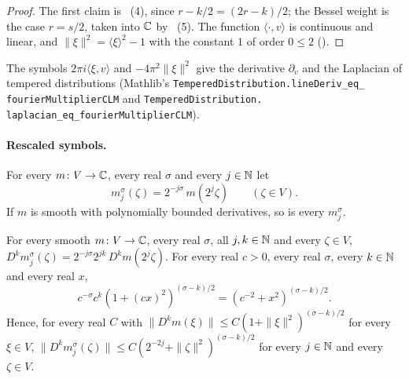 \begin{proof}
\leanok
The first claim is ~(4), since $r - k/2 = (2r - k)/2$; the
Bessel weight is the case $r = s/2$, taken into $\mathbb{C}$ by ~(5). The
function $\langle \cdot, v \rangle$ is continuous and linear, and
$\|\xi\|^2 = \langle \xi \rangle^2 - 1$ with the constant $1$ of order $0 \leq 2$
().
\end{proof}

The symbols $2\pi i \langle \xi, v \rangle$ and $-4\pi^2 \|\xi\|^2$ give the derivative
$\partial_v$ and the Laplacian of tempered distributions (Mathlib's
\texttt{TemperedDistribution.\allowbreak lineDeriv\_\allowbreak eq\_\allowbreak
fourier\allowbreak MultiplierCLM} and \texttt{TemperedDistribution.\allowbreak
laplacian\_\allowbreak eq\_\allowbreak fourier\allowbreak MultiplierCLM}).

\paragraph{Rescaled symbols.}

\begin{definition}
\label{def:scaled-symbol}
\leanok
For every $m \colon V \to \mathbb{C}$, every real $\sigma$ and every $j \in \mathbb{N}$ let
\[
  m^\sigma_j(\zeta) = 2^{-j\sigma} \, m(2^j \zeta) \qquad (\zeta \in V) .
\]
If $m$ is smooth with polynomially bounded derivatives, so is every $m^\sigma_j$.
\end{definition}

\begin{lemma}
\label{lem:scaled-symbol-derivatives}
\leanok
{}
For every smooth $m \colon V \to \mathbb{C}$, every real $\sigma$, all $j, k \in \mathbb{N}$ and every
$\zeta \in V$,
$D^k m^\sigma_j(\zeta) = 2^{-j\sigma} 2^{jk} \, D^k m(2^j \zeta)$. For every real $c > 0$,
every real $\sigma$, every $k \in \mathbb{N}$ and every real $x$,
\[
  c^{-\sigma} c^k (1 + (c x)^2)^{(\sigma - k)/2} = (c^{-2} + x^2)^{(\sigma - k)/2} .
\]
Hence, for every real $C$ with $\|D^k m(\xi)\| \leq C (1 + \|\xi\|^2)^{(\sigma - k)/2}$ for every
$\xi \in V$, $\|D^k m^\sigma_j(\zeta)\| \leq C (2^{-2j} + \|\zeta\|^2)^{(\sigma - k)/2}$ for
every $j \in \mathbb{N}$ and every $\zeta \in V$.
\end{lemma}

